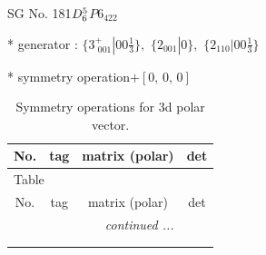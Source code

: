 \documentclass[fleqn,8pt]{jsarticle}
\begin{document}
\setcounter{MaxMatrixCols}{32}

\renewcommand{\tablename}{Table~}
\renewcommand{\figurename}{Figure~}
\begin{center}
\LARGE
SG No. 181\quad$D_{\rm 6}^{5}$\quad$P6_422$\quad[ hexagonal ]
\end{center}

* generator : $\{3^{+}_{\,\,001}|0 0 \frac{1}{3}\},\,\,\{2{}_{001}|0\},\,\,\{2{}_{110}|0 0 \frac{1}{3}\}$

* symmetry operation\quad$+\left[ 0,\, 0,\, 0 \right]$
\renewcommand{\arraystretch}{1.3}
\begin{longtable}{cccc}
\caption{Symmetry operations for 3d polar vector.}
 \\
 \hline \hline
No. & tag & matrix (polar) & det \\ \hline \endfirsthead

\multicolumn{3}{l}{\tablename\ \thetable{}} \\
 \hline \hline
No. & tag & matrix (polar) & det \\ \hline \endhead

 \hline \hline
\multicolumn{3}{r}{\footnotesize\it continued ...} \\ \endfoot

 \hline \hline
\multicolumn{3}{r}{} \\ \endlastfoot


\end{longtable}
\end{document}
